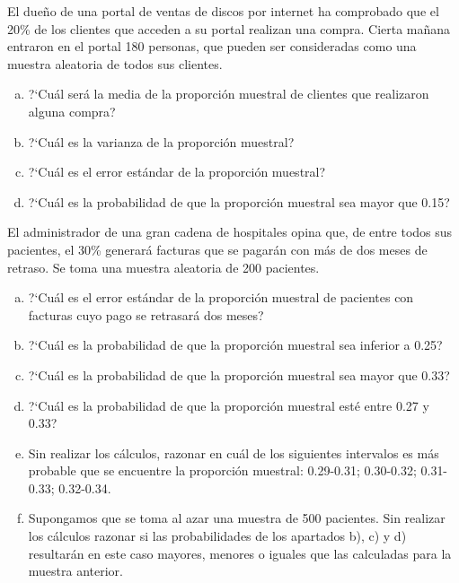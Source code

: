 \documentclass[12pt]{article}
\begin{document}
        \begin{prob}
    El dueño de una portal de ventas de discos por internet ha comprobado que el 20\% de los
    clientes que acceden a su portal realizan una compra. Cierta mañana
    entraron en el portal 180 personas, que pueden ser consideradas como
    una muestra aleatoria de todos sus clientes.
        \begin{enumerate}[a)]
        \item ?`Cuál será la media de la proporción muestral de clientes
        que realizaron alguna compra?
        \item ?`Cuál es la varianza de la proporción muestral?
        \item ?`Cuál es el error estándar de la proporción muestral?
        \item ?`Cuál es la probabilidad de que la proporción muestral sea
        mayor que 0.15?
        \end{enumerate}
\end{prob}

                \begin{prob}
    El administrador de una gran cadena de hospitales opina que, de
    entre todos sus pacientes, el 30\% generará facturas que se pagarán
    con más de dos meses de retraso. Se toma una muestra aleatoria de 200
    pacientes.
        \begin{enumerate}[a)]
        \item ?`Cuál es el error estándar de la proporción muestral de
        pacientes con facturas cuyo pago se retrasará dos meses?
        \item ?`Cuál es la probabilidad de que la proporción muestral sea
        inferior a   0.25?
        \item  ?`Cuál es la probabilidad de que la proporción muestral sea
        mayor que 0.33?
        \item  ?`Cuál es la probabilidad de que la proporción muestral esté
        entre 0.27 y 0.33?
        \item Sin realizar los cálculos, razonar en cuál de los siguientes
        intervalos es más probable que se encuentre la proporción
        muestral: 0.29-0.31; 0.30-0.32; 0.31-0.33; 0.32-0.34.
        \item Supongamos que se toma al azar una muestra de 500 pacientes.
        Sin realizar los cálculos razonar si las probabilidades de los
        apartados b), c)  y d) resultarán en este caso mayores, menores o iguales
        que las calculadas para la muestra anterior.
        \end{enumerate}
        \end{prob}
\end{document}

